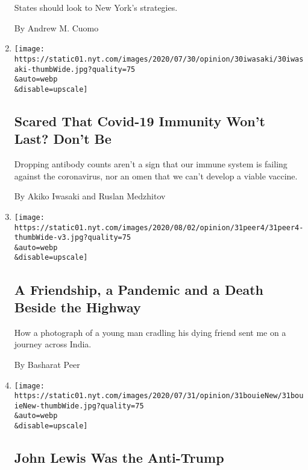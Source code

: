 \begin{enumerate}
  States should look to New York's strategies.

  By Andrew M. Cuomo
\item
  \href{/2020/07/31/opinion/coronavirus-antibodies-immunity.html}{}

  \texttt{[image: https://static01.nyt.com/images/2020/07/30/opinion/30iwasaki/30iwasaki-thumbWide.jpg?quality=75\\\&auto=webp\\\&disable=upscale]}

  \hypertarget{scared-that-covid-19-immunity-wont-last-dont-be}{%
  \subsection{Scared That Covid-19 Immunity Won't Last? Don't
  Be}\label{scared-that-covid-19-immunity-wont-last-dont-be}}

  Dropping antibody counts aren't a sign that our immune system is
  failing against the coronavirus, nor an omen that we can't develop a
  viable vaccine.

  By Akiko Iwasaki and Ruslan Medzhitov
\item
  \href{/2020/07/31/opinion/sunday/India-migration-coronavirus.html}{}

  \texttt{[image: https://static01.nyt.com/images/2020/08/02/opinion/31peer4/31peer4-thumbWide-v3.jpg?quality=75\\\&auto=webp\\\&disable=upscale]}

  \hypertarget{a-friendship-a-pandemic-and-a-death-beside-the-highway}{%
  \subsection{A Friendship, a Pandemic and a Death Beside the
  Highway}\label{a-friendship-a-pandemic-and-a-death-beside-the-highway}}

  How a photograph of a young man cradling his dying friend sent me on a
  journey across India.

  By Basharat Peer
\item
  \href{/2020/07/31/opinion/sunday/john-lewis-trump-election-2020.html}{}

  \texttt{[image: https://static01.nyt.com/images/2020/07/31/opinion/31bouieNew/31bouieNew-thumbWide.jpg?quality=75\\\&auto=webp\\\&disable=upscale]}

  \hypertarget{john-lewis-was-the-anti-trump}{%
  \subsection{John Lewis Was the
  Anti-Trump}\label{john-lewis-was-the-anti-trump}}


\end{enumerate}
